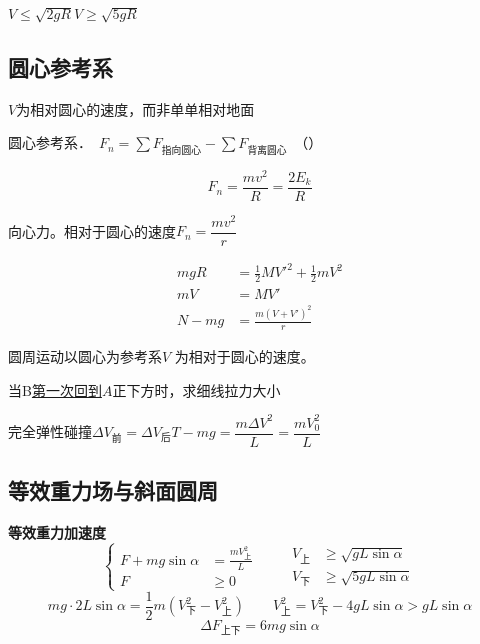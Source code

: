 \noindent $V\le\sqrt{2gR}$\qquad $V\ge\sqrt{5gR}$

\subsection{圆心参考系}
$V$为相对圆心的速度，而非单单相对地面

圆心参考系．\ $F_n=\sum F_{\text{指向圆心}}-\sum F_{\text{背离圆心}}$\ （）

\[ F_n=\frac{mv^2}{R}=\frac{2E_k}{R} \]

向心力。相对于圆心的速度\quad $F_n=\dfrac{mv^2}{r}$

\begin{align*}
mgR&=\frac12MV'^2+\frac12mV^2\\
mV&=MV'\\
N-mg&=\frac{m(V+V')^2}{r}
\end{align*}

\noindent 圆周运动以圆心为参考系\qquad $V$ 为相对于圆心的速度。
\begin{problem}
当B\underline{第一次回到$A$}正下方时，求细线拉力大小
\begin{solution}
完全弹性碰撞\qquad $\Delta V_{\text{前}}=\Delta V_{\text{后}}$\qquad $T-mg=\dfrac{m\Delta V^2}{L}=\dfrac{mV_0^2}{L}$
\end{solution}
\end{problem}

\subsection{等效重力场与斜面圆周}
\textbf{等效重力加速度}
\[ \left\{\begin{aligned}F+mg\sin\alpha&=\frac{mV_{\text{上}}^2}{L}\\ F&\ge0\end{aligned}\right. \qquad \begin{aligned}V_{\text{上}}&\ge\sqrt{gL\sin\alpha}\\ V_{\text{下}}&\ge\sqrt{5gL\sin\alpha}\end{aligned} \]
\[ mg\cdot2L\sin\alpha=\frac{1}{2}m(V_{\text{下}}^2-V_{\text{上}}^2)\qquad V_{\text{上}}^2=V_{\text{下}}^2-4gL\sin\alpha>gL\sin\alpha \] %
\[ \Delta F_{\text{上下}}=6mg\sin\alpha \]

